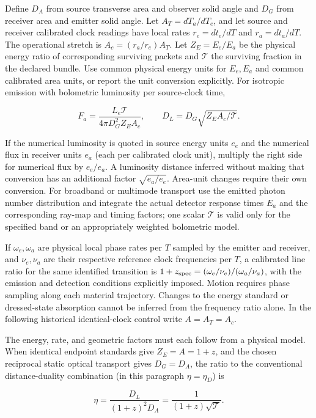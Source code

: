\documentclass[
  11pt,
  twoside]{article}
\begin{document}
Define \(D_A\) from source transverse area and observer solid angle and
\(D_G\) from receiver area and emitter solid angle. Let
\(A_T=dT_a/dT_e\), and let source and receiver calibrated clock readings
have local rates \(r_e=dt_e/dT\) and \(r_a=dt_a/dT\). The operational
stretch is \(A_c=(r_a/r_e)A_T\). Let \(Z_E=E_e/E_a\) be the physical
energy ratio of corresponding surviving packets and \(\mathcal T\) the
surviving fraction in the declared bundle. Use common physical energy
units for \(E_e,E_a\) and common calibrated area units, or report the
unit conversion explicitly. For isotropic emission with bolometric
luminosity per source-clock time,

\[F_a=\frac{L_e\mathcal T}{4\pi D_G^2 Z_E A_c},\qquad D_L=D_G\sqrt{Z_E A_c/\mathcal T}.\tag{O1}\]

If the numerical luminosity is quoted in source energy units \(e_e\) and
the numerical flux in receiver units \(e_a\) (each per calibrated clock
unit), multiply the right side for numerical flux by \(e_e/e_a\). A
luminosity distance inferred without making that conversion has an
additional factor \(\sqrt{e_a/e_e}\). Area-unit changes require their
own conversion. For broadband or multimode transport use the emitted
photon number distribution and integrate the actual detector response
times \(E_a\) and the corresponding ray-map and timing factors; one
scalar \(\mathcal T\) is valid only for the specified band or an
appropriately weighted bolometric model.

If \(\omega_e,\omega_a\) are physical local phase rates per \(T\)
sampled by the emitter and receiver, and \(\nu_e,\nu_a\) are their
respective reference clock frequencies per \(T\), a calibrated line
ratio for the same identified transition is
\(1+z_{\rm spec}=(\omega_e/\nu_e)/(\omega_a/\nu_a)\), with the emission
and detection conditions explicitly imposed. Motion requires phase
sampling along each material trajectory. Changes to the energy standard
or dressed-state absorption cannot be inferred from the frequency ratio
alone. In the following historical identical-clock control write
\(A=A_T=A_c\).

The energy, rate, and geometric factors must each follow from a physical
model. When identical endpoint standards give \(Z_E=A=1+z\), and the
chosen reciprocal static optical transport gives \(D_G=D_A\), the ratio
to the conventional distance-duality combination (in this paragraph
\(η=η_D\)) is

\[\eta=\frac{D_L}{(1+z)^2D_A}=\frac{1}{(1+z)\sqrt{\mathcal T}}.\]
\end{document}
